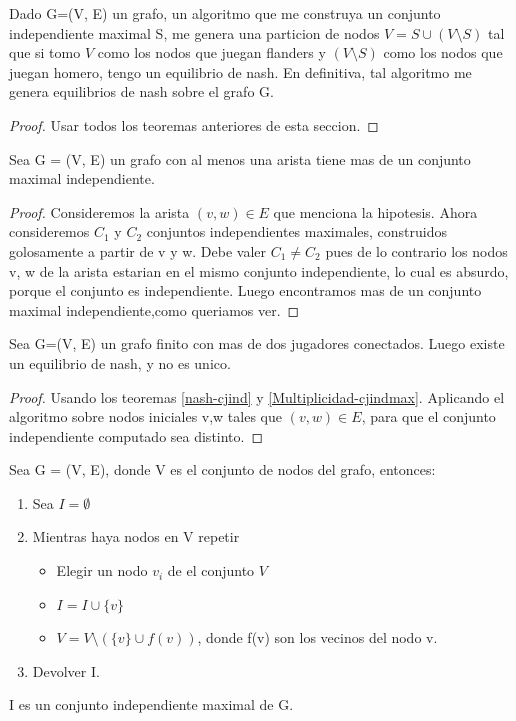 \begin{theorem}
	\label{nash-cjind}
	Dado G=(V, E) un grafo, un algoritmo que me construya un conjunto independiente maximal S, me genera una particion de nodos $V = S \cup (V \setminus S)$ tal que si tomo $V$ como los nodos que juegan flanders y $(V\setminus S)$ como los nodos que juegan homero, tengo un equilibrio de nash. En definitiva, tal algoritmo me genera equilibrios de nash sobre el grafo G.
\end{theorem}
\begin{proof}
	Usar todos los teoremas anteriores de esta seccion.
\end{proof}

\begin{theorem}
	\label{Multiplicidad-cjindmax}
	Sea G = (V, E) un grafo con al menos una arista tiene mas de un conjunto maximal independiente.
\end{theorem}
\begin{proof}
	Consideremos la arista $(v, w)\in E$ que menciona la hipotesis. Ahora consideremos $C_1$ y $C_2$ conjuntos independientes maximales, construidos golosamente a partir de v y w. Debe valer $C_1 \neq C_2$ pues de lo contrario los nodos v, w de la arista estarian en el mismo conjunto independiente, lo cual es absurdo, porque el conjunto es independiente. Luego encontramos mas de un conjunto maximal independiente,como queriamos ver.  

\end{proof}
\begin{theorem}
	Sea G=(V, E) un grafo finito con mas de dos jugadores conectados. Luego existe un equilibrio de nash, y no es unico.
\end{theorem}
\begin{proof}
	Usando los teoremas \ref{nash-cjind} y \ref{Multiplicidad-cjindmax}. Aplicando el algoritmo sobre nodos iniciales v,w tales que $(v,w) \in E$, para que el conjunto independiente computado sea distinto.
\end{proof}

\begin{theorem}
	Sea G = (V, E), donde V es el conjunto de nodos del grafo, entonces:
	\begin{enumerate}
		\item Sea $I = \emptyset$
		\item Mientras haya nodos en V repetir
		\begin{itemize}
			\item Elegir un nodo $v_i$ de el conjunto $V$
			\item $I = I \cup \{v\} $
			\item $V = V \setminus (\{v\} \cup f(v)) $, donde f(v) son los vecinos del nodo v.
		\end{itemize}
		\item Devolver I.
	\end{enumerate}
	I es un conjunto independiente maximal de G.
\end{theorem}

